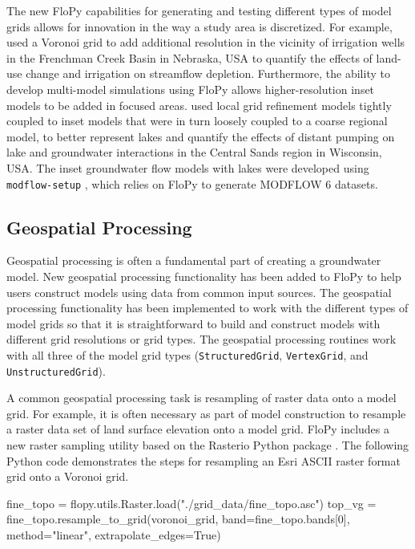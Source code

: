 \documentclass[12pt, oneside]{article}  	%
\begin{document}
The new FloPy capabilities for generating and testing different types of model grids allows for innovation in the way a study area is discretized. For example, \cite{Moussa2018} used a Voronoi grid to add additional resolution in the vicinity of irrigation wells in the Frenchman Creek Basin in Nebraska, USA to quantify the effects of land-use change and irrigation on streamflow depletion. Furthermore, the ability to develop multi-model simulations using FloPy allows higher-resolution inset models to be added in focused areas. \cite{fienen2022simulation} used local grid refinement models tightly coupled to inset models that were in turn loosely coupled to a coarse regional model, to better represent lakes and quantify the effects of distant pumping on lake and groundwater interactions in the Central Sands region in Wisconsin, USA. The inset groundwater flow models with lakes \citep{fienen2022simulation} were developed using \texttt{modflow-setup} \citep{leaf2022modflow}, which relies on FloPy to generate MODFLOW 6 datasets.

\subsection*{Geospatial Processing}

Geospatial processing is often a fundamental part of creating a groundwater model. New geospatial processing functionality has been added to FloPy to help users construct models using data from common input sources. The geospatial processing functionality has been implemented to work with the different types of model grids so that it is straightforward to build and construct models with different grid resolutions or grid types. The geospatial processing routines work with all three of the model grid types (\texttt{StructuredGrid}, \texttt{VertexGrid}, and \texttt{UnstructuredGrid}). 

A common geospatial processing task is resampling of raster data onto a model grid. For example, it is often necessary as part of model construction to resample a raster data set of land surface elevation onto a model grid. FloPy includes a new raster sampling utility based on the Rasterio Python package \citep{gillies_2019}. The following Python code demonstrates the steps for resampling an Esri ASCII raster format grid onto a Voronoi grid.

\begin{python}
fine_topo = flopy.utils.Raster.load("./grid_data/fine_topo.asc")
top_vg = fine_topo.resample_to_grid(voronoi_grid, band=fine_topo.bands[0],
                                    method="linear", extrapolate_edges=True)
\end{python}
\end{document}
